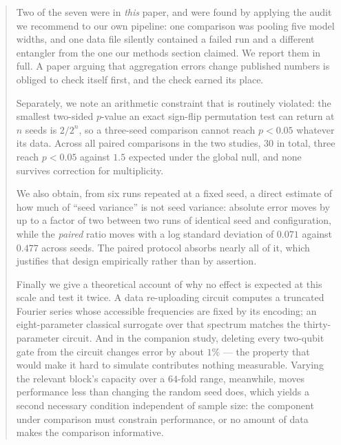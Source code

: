 \documentclass[11pt,onecolumn]{article}
\begin{document}
\begin{abstract}
Two of the seven were in \emph{this} paper, and were found by applying
the audit we recommend to our own pipeline: one comparison was pooling
five model widths, and one data file silently contained a failed run and
a different entangler from the one our methods section claimed. We
report them in full. A paper arguing that aggregation errors change
published numbers is obliged to check itself first, and the check
earned its place.

Separately, we note an arithmetic constraint that is routinely violated:
the smallest two-sided $p$-value an exact sign-flip permutation test can
return at $n$ seeds is $2/2^n$, so a three-seed comparison cannot reach
$p < 0.05$ whatever its data. Across all paired comparisons in the two
studies, $30$ in total, three reach $p < 0.05$ against $1.5$ expected
under the global null, and none survives correction for multiplicity.

We also obtain, from six runs repeated at a fixed seed, a direct
estimate of how much of ``seed variance'' is not seed variance:
absolute error moves by up to a factor of two between two runs of
identical seed and configuration, while the \emph{paired} ratio moves
with a log standard deviation of $0.071$ against $0.477$ across seeds.
The paired protocol absorbs nearly all of it, which justifies that
design empirically rather than by assertion.

Finally we give a theoretical account of why no effect is expected at
this scale and test it twice. A data re-uploading circuit computes a
truncated Fourier series whose accessible frequencies are fixed by its
encoding; an eight-parameter classical surrogate over that spectrum
matches the thirty-parameter circuit. And in the companion study,
deleting every two-qubit gate from the circuit changes error by about
$1\%$ --- the property that would make it hard to simulate contributes
nothing measurable. Varying the relevant block's capacity over a
$64$-fold range, meanwhile, moves performance less than changing the
random seed does, which yields a second necessary condition independent
of sample size: the component under comparison must constrain
performance, or no amount of data makes the comparison informative.
\end{abstract}

\vspace{1em}

\end{document}
